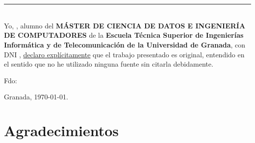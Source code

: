 \chapter*{}
\thispagestyle{empty}

\noindent\rule[-1ex]{\textwidth}{2pt}\\[4.5ex]

Yo, \textbf{\estudiante}, alumno del \textbf{MÁSTER DE CIENCIA DE DATOS E INGENIERÍA DE COMPUTADORES} de la \textbf{Escuela Técnica Superior de Ingenierías Informática y de Telecomunicación de la Universidad de Granada}, con DNI \textbf{\dni}, \underline{declaro explícitamente} que el trabajo presentado es original, entendido en el sentido que no he utilizado ninguna fuente sin citarla debidamente.

\vspace{6cm}

\noindent Fdo: \textbf{\estudiante}

\vspace{2cm}

\begin{flushright}
Granada, \today.
\end{flushright}





\chapter*{Agradecimientos}
\thispagestyle{empty}

\vspace{1cm}



